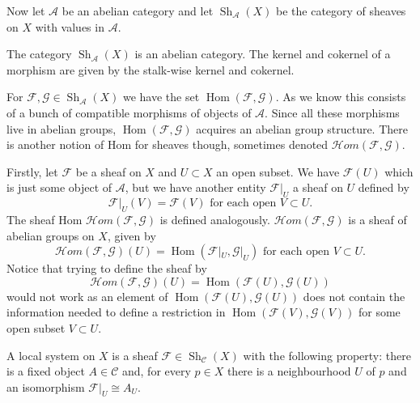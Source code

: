 Now let $\mathcal A$ be an abelian category and let $\operatorname{Sh}_{\mathcal A}(X)$ be the category of sheaves on $X$ with
values in $\mathcal A$.

\begin{proposition}
The category $\operatorname{Sh}_{\mathcal A}(X)$ is an abelian category. The kernel and cokernel
of a morphism are given by the stalk-wise kernel and cokernel.
\end{proposition}

For $\mathcal F,\mathcal G\in\operatorname{Sh}_{\mathcal A}(X)$ we have the set
$\operatorname{Hom}(\mathcal F,\mathcal G)$. As we know this consists of a bunch of
compatible morphisms of objects of $\mathcal A$. Since all these morphisms live in abelian groups,
$\operatorname{Hom}(\mathcal F,\mathcal G)$ acquires an abelian group structure. There is another notion of Hom for sheaves
though, sometimes denoted $\mathcal Hom(\mathcal F,\mathcal G)$.

Firstly, let $\mathcal F$ be a sheaf on $X$ and $U\subset X$ an open subset. We have
$\mathcal F(U)$ which is just some object of $\mathcal A$, but we have another entity $\mathcal F|_U$ a sheaf on $U$ defined by
\[
\mathcal F|_U(V)=\mathcal F(V)\text{ for each open }V\subset U.
\]
\label{definition-restriction-sheaf}
The sheaf Hom $\mathcal Hom(\mathcal F,\mathcal G)$ is defined analogously.
$\mathcal Hom(\mathcal F,\mathcal G)$ is a sheaf of abelian groups on $X$, given by
\[
\mathcal Hom(\mathcal F,\mathcal G)(U)=\operatorname{Hom}(\mathcal F|_U,\mathcal G|_U)
\text{ for each open }V\subset U.
\]
Notice that trying to define the sheaf by
\[
\mathcal Hom(\mathcal F,\mathcal G)(U)=\operatorname{Hom}(\mathcal F(U),\mathcal G(U))
\]
would not work as an element of $\operatorname{Hom}(\mathcal F(U),\mathcal G(U))$ does not contain the information needed
to define a restriction in $\operatorname{Hom}(\mathcal F(V),\mathcal G(V))$ for some open subset $V\subset U$.

\begin{definition}
\label{definition-local-system}
A local system on $X$ is a sheaf $\mathcal F\in\operatorname{Sh}_{\mathcal C}(X)$ with the following property:
there is a fixed object $A\in\mathcal C$ and, for every $p\in X$ there is a neighbourhood $U$ of $p$ and an
isomorphism $\mathcal F|_U\cong A_U$.
\end{definition}

